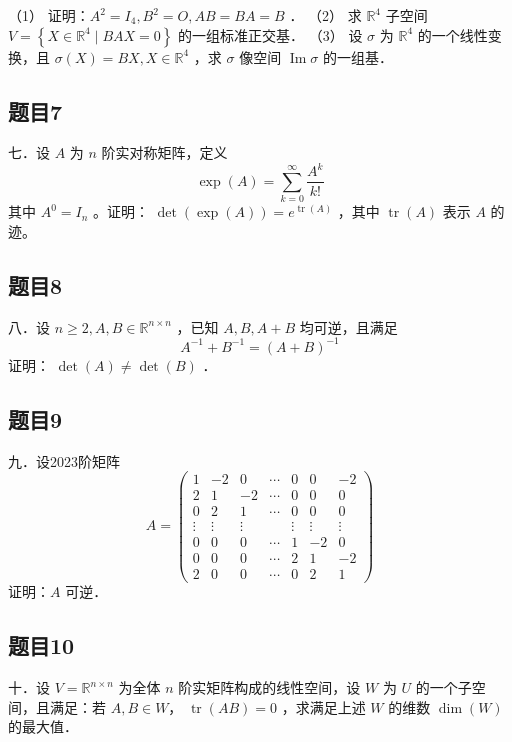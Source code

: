 \documentclass{article}
\begin{document}
（1） 证明：\(A^{2}=I_{4}, B^{2}=O, A B=B A=B\) ．
（2） 求 \(\mathbb{R}^{4}\) 子空间 \(V=\left\{X \in \mathbb{R}^{4} \mid B A X=0\right\}\) 的一组标准正交基．
（3） 设 \(\sigma\) 为 \(\mathbb{R}^{4}\) 的一个线性变换，且 \(\sigma(X)=B X, X \in \mathbb{R}^{4}\) ，求 \(\sigma\) 像空间 \(\operatorname{Im} \sigma\) 的一组基．

\subsection{题目7}
七．设 \(A\) 为 \(n\) 阶实对称矩阵，定义
\[
\exp (A)=\sum_{k=0}^{\infty} \frac{A^{k}}{k!}
\]
其中 \(A^{0}=I_{n}\) 。证明： \(\operatorname{det}(\exp (A))=e^{\operatorname{tr}(A)}\) ，其中 \(\operatorname{tr}(A)\) 表示 \(A\) 的迹。

\subsection{题目8}
八．设 \(n \geq 2, A, B \in \mathbb{R}^{n \times n}\) ，已知 \(A, B, A+B\) 均可逆，且满足
\[
A^{-1}+B^{-1}=(A+B)^{-1}
\]
证明： \(\operatorname{det}(A) \neq \operatorname{det}(B)\) ．

\subsection{题目9}
九．设2023阶矩阵
\[
A=\left(\begin{array}{ccccccc}
1 & -2 & 0 & \cdots & 0 & 0 & -2 \\
2 & 1 & -2 & \cdots & 0 & 0 & 0 \\
0 & 2 & 1 & \cdots & 0 & 0 & 0 \\
\vdots & \vdots & \vdots & & \vdots & \vdots & \vdots \\
0 & 0 & 0 & \cdots & 1 & -2 & 0 \\
0 & 0 & 0 & \cdots & 2 & 1 & -2 \\
2 & 0 & 0 & \cdots & 0 & 2 & 1
\end{array}\right)
\]
证明：\(A\) 可逆．

\subsection{题目10}
十．设 \(V=\mathbb{R}^{n \times n}\) 为全体 \(n\) 阶实矩阵构成的线性空间，设 \(W\) 为 \(U\) 的一个子空间，且满足：若 \(A, B \in W\)， \(\operatorname{tr}(A B)=0\) ，求满足上述 \(W\) 的维数 \(\operatorname{dim}(W)\) 的最大值．
\end{document}
